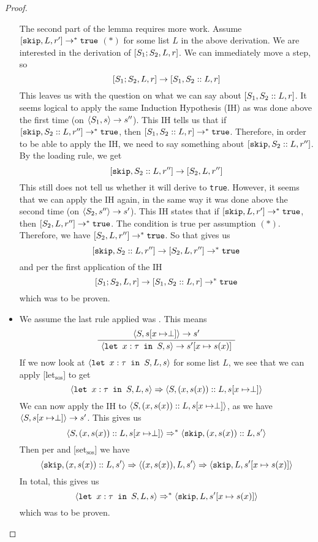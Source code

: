 \begin{proof}
\begin{itemize}[noitemsep]
    The second part of the lemma requires more work. Assume $[ \texttt{skip}, L, r' ] \to ^{*} \texttt{true}$ $( * )$ for some list $L$ in the above derivation. We are interested in the derivation of $[ S_1;S_2, L, r ]$. We can immediately move a step, so
    $$[ S_1;S_2, L, r ] \to [ S_1, S_2::L, r ]$$
    This leaves us with the question on what we can say about $[ S_1, S_2::L, r ]$. It seems logical to apply the same Induction Hypothesis (IH) as was done above the first time (on $\langle S_1, s \rangle \to s''$). This IH tells us that if $[ \texttt{skip}, S_2::L, r'' ] \to ^{*} \texttt{true}$, then $[ S_1, S_2::L, r ] \to ^{*} \texttt{true}$. Therefore, in order to be able to apply the IH, we need to say something about $[ \texttt{skip}, S_2::L, r'' ]$. By the loading rule, we get
    $$[ \texttt{skip}, S_2::L, r'' ] \to [ S_2, L, r'' ]$$
    This still does not tell us whether it will derive to \texttt{true}. However, it seems that we can apply the IH again, in the same way it was done above the second time (on $\langle S_2, s'' \rangle \to s'$). This IH states that if $[ \texttt{skip}, L, r' ] \to ^{*} \texttt{true}$, then $[ S_2, L, r'' ] \to ^{*} \texttt{true}$. The condition is true per assumption $( * )$. Therefore, we have $[ S_2, L, r'' ] \to ^{*} \texttt{true}$. So that gives us
    $$[ \texttt{skip}, S_2::L, r'' ] \to [ S_2, L, r'' ] \to ^{*} \texttt{true}$$
    and per the first application of the IH
    $$[ S_1;S_2, L, r ] \to [ S_1, S_2::L, r ]  \to ^{*} \texttt{true}$$
    which was to be proven. 
    \item We assume the last rule applied was . This means
    $$\AxiomC{$\ns{S}{s[x\mapsto \perp]}{s'}$}
\UnaryInfC{$\ns{\letm{x}{S}}{s}{s'[x \mapsto s(x)]}$}
\DisplayProof$$
    If we now look at $\langle \texttt{let }x : \tau \texttt{ in } S, L, s \rangle$ for some list $L$, we see that we can apply   [let$_{\textrm{sos}}$] to get 
    $$\langle \texttt{let }x : \tau \texttt{ in } S, L, s \rangle \Rightarrow \langle S, (x,s(x))::L, s[x\mapsto \perp] \rangle$$
    We can now apply the IH to $\langle S, (x,s(x))::L, s[x\mapsto \perp] \rangle$, as we have $\langle S, s[x\mapsto \perp] \rangle \to s'$. This gives us
    $$\langle S, (x,s(x))::L, s[x\mapsto \perp] \rangle \Rightarrow ^{*} \langle \texttt{skip}, (x,s(x))::L, s' \rangle$$
    Then per \loadsos and [set$_{\textrm{sos}}$] we have
    $$\langle \texttt{skip}, (x,s(x))::L, s' \rangle \Rightarrow \langle (x,s(x)), L, s' \rangle \Rightarrow \langle \texttt{skip}, L, s'[x \mapsto s(x)] \rangle$$
    In total, this gives us
    $$\langle \texttt{let }x : \tau \texttt{ in } S, L, s \rangle \Rightarrow ^{*} \langle \texttt{skip}, L, s'[x \mapsto s(x)] \rangle $$
    which was to be proven.
    

\end{itemize}
\end{proof}
